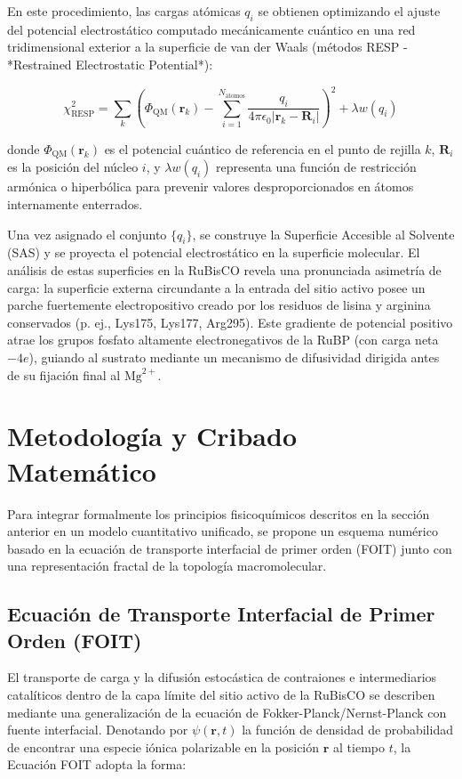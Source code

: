 \documentclass[12pt]{article}
\begin{document}
En este procedimiento, las cargas atómicas $q_i$ se obtienen optimizando el ajuste del potencial electrostático computado mecánicamente cuántico en una red tridimensional exterior a la superficie de van der Waals (métodos RESP - *Restrained Electrostatic Potential*):

\begin{equation}
\chi_{\text{RESP}}^2 = \sum_k \left( \Phi_{\text{QM}}(\mathbf{r}_k) - \sum_{i=1}^{N_{\text{átomos}}} \frac{q_i}{4\pi \epsilon_0 |\mathbf{r}_k - \mathbf{R}_i|} \right)^2 + \lambda w(q_i)
\end{equation}

donde $\Phi_{\text{QM}}(\mathbf{r}_k)$ es el potencial cuántico de referencia en el punto de rejilla $k$, $\mathbf{R}_i$ es la posición del núcleo $i$, y $\lambda w(q_i)$ representa una función de restricción armónica o hiperbólica para prevenir valores desproporcionados en átomos internamente enterrados.

Una vez asignado el conjunto $\{q_i\}$, se construye la Superficie Accesible al Solvente (SAS) y se proyecta el potencial electrostático en la superficie molecular. El análisis de estas superficies en la RuBisCO revela una pronunciada asimetría de carga: la superficie externa circundante a la entrada del sitio activo posee un parche fuertemente electropositivo creado por los residuos de lisina y arginina conservados (p. ej., Lys175, Lys177, Arg295). Este gradiente de potencial positivo atrae los grupos fosfato altamente electronegativos de la RuBP (con carga neta $-4e$), guiando al sustrato mediante un mecanismo de difusividad dirigida antes de su fijación final al $\text{Mg}^{2+}$.

\section{Metodología y Cribado Matemático}

Para integrar formalmente los principios fisicoquímicos descritos en la sección anterior en un modelo cuantitativo unificado, se propone un esquema numérico basado en la ecuación de transporte interfacial de primer orden (FOIT) junto con una representación fractal de la topología macromolecular.

\subsection{Ecuación de Transporte Interfacial de Primer Orden (FOIT)}

El transporte de carga y la difusión estocástica de contraiones e intermediarios catalíticos dentro de la capa límite del sitio activo de la RuBisCO se describen mediante una generalización de la ecuación de Fokker-Planck/Nernst-Planck con fuente interfacial. Denotando por $\psi(\mathbf{r}, t)$ la función de densidad de probabilidad de encontrar una especie iónica polarizable en la posición $\mathbf{r}$ al tiempo $t$, la Ecuación FOIT adopta la forma:
\end{document}
